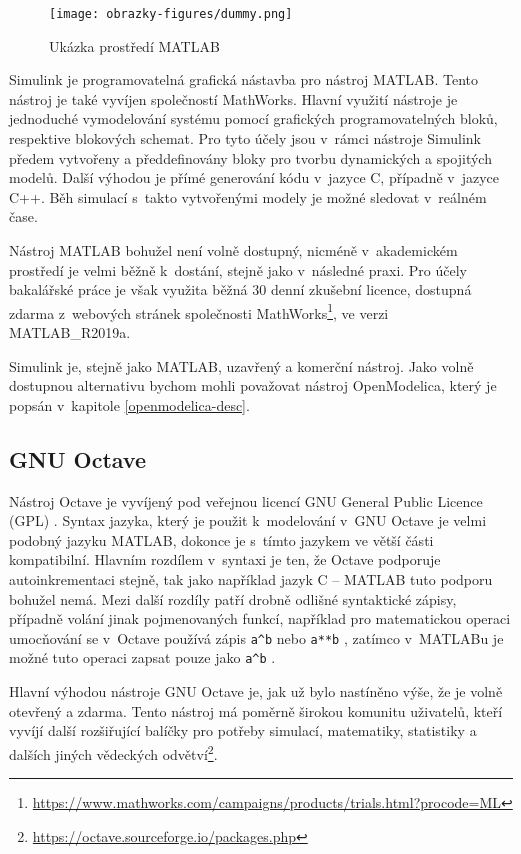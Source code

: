 \begin{figure}
    \centering
    \texttt{[image: obrazky-figures/dummy.png]}
    \caption{Ukázka prostředí MATLAB}
    \label{fig:matlab}
\end{figure}

Simulink je programovatelná grafická nástavba pro nástroj MATLAB. Tento nástroj je také vyvíjen společností MathWorks. Hlavní využití nástroje je jednoduché vymodelování systému pomocí grafických programovatelných bloků, respektive blokových schemat. Pro tyto účely jsou v~rámci nástroje Simulink předem vytvořeny a předdefinovány bloky pro tvorbu dynamických a spojitých modelů. Další výhodou je přímé generování kódu v~jazyce C, případně v~jazyce C++. Běh simulací s~takto vytvořenými modely je možné sledovat v~reálném čase.

Nástroj MATLAB bohužel není volně dostupný, nicméně v~akademickém prostředí je velmi běžně k~dostání, stejně jako v~následné praxi. Pro účely bakalářské práce je však využita běžná 30 denní zkušební licence, dostupná zdarma z~webových stránek společnosti MathWorks\footnote{\url{https://www.mathworks.com/campaigns/products/trials.html?procode=ML}}, ve verzi MATLAB\_R2019a.

Simulink je, stejně jako MATLAB, uzavřený a komerční nástroj. Jako volně dostupnou alternativu bychom mohli považovat nástroj OpenModelica, který je popsán v~kapitole \ref{openmodelica-desc}.

\subsection{GNU Octave}
\label{octave-desc}
Nástroj Octave je vyvíjený pod veřejnou licencí GNU General Public Licence (GPL) \cite{OctaveManual}. Syntax jazyka, který je použit k~modelování v~GNU Octave je velmi podobný jazyku MATLAB, dokonce je s~tímto jazykem ve větší části kompatibilní. Hlavním rozdílem v~syntaxi je ten, že Octave podporuje autoinkrementaci stejně, tak jako například jazyk C -- MATLAB tuto podporu bohužel nemá.
Mezi další rozdíly patří drobně odlišné syntaktické zápisy, případně volání jinak pojmenovaných funkcí, například pro matematickou operaci umocňování se v~Octave používá zápis \texttt{a\^\space b} nebo \texttt{a**b} \cite{OctaveManual}, zatímco v~MATLABu je možné tuto operaci zapsat pouze jako \texttt{a\^\space b} \cite{MATLAB:2010}.

Hlavní výhodou nástroje GNU Octave je, jak už bylo nastíněno výše, že je volně otevřený a zdarma. Tento nástroj má poměrně širokou komunitu uživatelů, kteří vyvíjí další rozšiřující balíčky pro potřeby simulací, matematiky, statistiky a dalších jiných vědeckých odvětví\footnote{\url{https://octave.sourceforge.io/packages.php}}.

